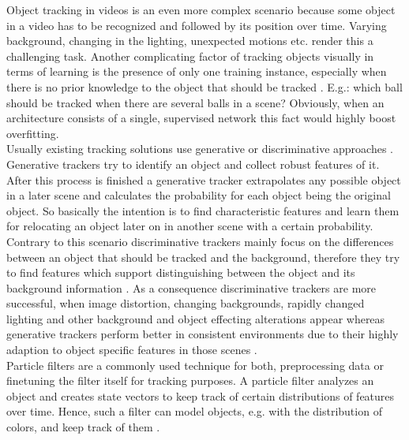 \documentclass[12pt,twoside]{article}
\theoremstyle{plain}
\theoremstyle{definition}
\theoremstyle{remark}
\begin{document}
Object tracking in videos is an even more complex scenario because some object in a video has to be recognized and followed by its position over time. Varying background, changing in the lighting, unexpected motions etc. render this a challenging task.
Another complicating factor of tracking objects visually in terms of learning is the presence of only one training instance, especially when there is no prior knowledge to the object that should be tracked \cite{LearningDeepCompactImageTracking-Wang}. E.g.: which ball should be tracked when there are several balls in a scene? Obviously, when an architecture consists of a single, supervised network this fact would highly boost overfitting.
\\
Usually existing tracking solutions use generative or discriminative approaches \cite{GenerativeDiscriminativeTrackerBook}. Generative trackers try to identify an object and collect robust features of it. After this process is finished a generative tracker extrapolates any possible object in a later scene and calculates the probability for each object being the original object. So basically the intention is to find characteristic features and learn them for relocating an object later on in another scene with a certain probability.
Contrary to this scenario discriminative trackers mainly focus on the differences between an object that should be tracked and the background, therefore they try to find features which support distinguishing between the object and its background information \cite{GenerativeDiscriminativeTrackerBook}.
As a consequence discriminative trackers are more successful, when image distortion, changing backgrounds, rapidly changed lighting and other background and object effecting alterations appear whereas generative trackers perform better in consistent environments due to their highly adaption to object specific features in those scenes \cite{GenerativeDiscriminativePerformanceBenchmark}.
\\
Particle filters are a commonly used technique for both, preprocessing data or finetuning the filter itself for tracking purposes. A particle filter analyzes an object and creates state vectors to keep track of certain distributions of features over time. Hence, such a filter can model objects, e.g. with the distribution of colors, and keep track of them \cite{ParticleFilterObjectTracking}. 
\end{document}
